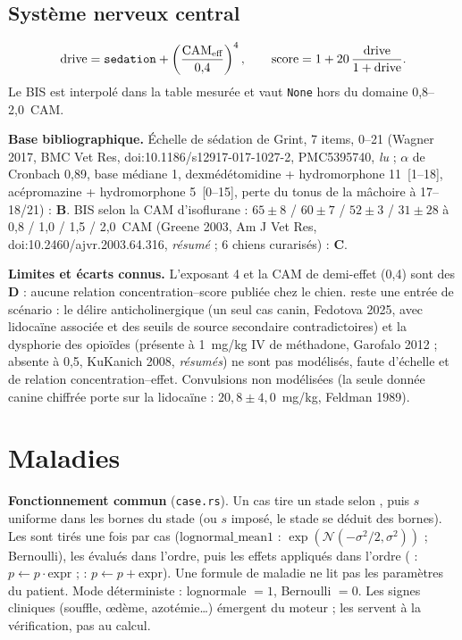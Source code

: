 \documentclass[10pt,a4paper]{article}
\newcommand{\cmd}[1]{\texttt{#1}}
\newcommand{\vp}[1]{\text{\texttt{\detokenize{#1}}}}
\newcommand{\evB}{\textcolor{green!45!black}{\textbf{B}}}
\newcommand{\evC}{\textcolor{orange!80!black}{\textbf{C}}}
\newcommand{\evD}{\textcolor{red!70!black}{\textbf{D}}}
\newcommand{\acc}[1]{\textsl{#1}}
\newcommand{\limite}[1]{\par\textbf{Limites et écarts connus.} #1}
\newcommand{\sources}[1]{\par\textbf{Base bibliographique.} #1}
\begin{document}
\subsection{Système nerveux central}
\begin{gather}
\text{drive} = \vp{sedation} + \left(\frac{\text{CAM}_\text{eff}}{0{,}4}\right)^{4},\qquad
\text{score} = 1 + 20\,\frac{\text{drive}}{1 + \text{drive}}.
\end{gather}
Le BIS est interpolé dans la table mesurée et vaut \cmd{None} hors du domaine 0,8--2,0~CAM.
\sources{Échelle de sédation de Grint, 7 items, 0--21 (Wagner 2017, BMC Vet Res,
doi:10.1186/s12917-017-1027-2, PMC5395740, \acc{lu} ; $\alpha$ de Cronbach 0,89, base médiane 1,
dexmédétomidine + hydromorphone 11~[1--18], acépromazine + hydromorphone 5~[0--15], perte du tonus
de la mâchoire à 17--18/21) : \evB{}. BIS selon la CAM d'isoflurane : $65 \pm 8$ / $60 \pm 7$ /
$52 \pm 3$ / $31 \pm 28$ à 0,8 / 1,0 / 1,5 / 2,0~CAM (Greene 2003, Am J Vet Res,
doi:10.2460/ajvr.2003.64.316, \acc{résumé} ; 6 chiens curarisés) : \evC{}.}
\limite{L'exposant 4 et la CAM de demi-effet (0,4) sont des \evD{} : aucune relation
concentration--score publiée chez le chien. \vp{excitation} reste une entrée de scénario : le
délire anticholinergique (un seul cas canin, Fedotova 2025, avec lidocaïne associée et des seuils
de source secondaire contradictoires) et la dysphorie des opioïdes (présente à 1~mg/kg IV de
méthadone, Garofalo 2012 ; absente à 0,5, KuKanich 2008, \acc{résumés}) ne sont pas modélisés,
faute d'échelle et de relation concentration--effet. Convulsions non modélisées (la seule donnée
canine chiffrée porte sur la lidocaïne : $20{,}8 \pm 4{,}0$~mg/kg, Feldman 1989).}

\section{Maladies}\label{sec:maladies}

\textbf{Fonctionnement commun} (\cmd{case.rs}). Un cas tire un stade selon \vp{prior}, puis $s$ uniforme dans les bornes du stade (ou $s$ imposé, le stade se déduit des bornes). Les \vp{draws} sont tirés une fois par cas ($\mathrm{lognormal\_mean1}$ : $\exp(\mathcal N(-\sigma^2/2, \sigma^2))$ ; Bernoulli), les \vp{let} évalués dans l'ordre, puis les effets appliqués dans l'ordre (\vp{mul} : $p \leftarrow p\cdot\text{expr}$ ; \vp{add} : $p \leftarrow p + \text{expr}$). Une formule de maladie ne lit pas les paramètres du patient. Mode déterministe : lognormale $= 1$, Bernoulli $= 0$. Les signes cliniques (souffle, œdème, azotémie\ldots) émergent du moteur ; les \vp{targets} servent à la vérification, pas au calcul.
\end{document}
